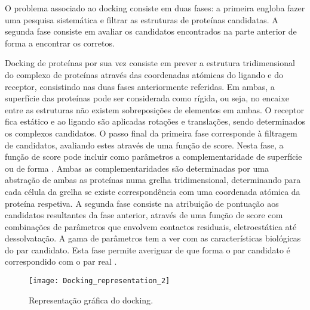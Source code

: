 O problema associado ao docking consiste em duas fases: a primeira engloba fazer uma pesquisa sistemática e filtrar as estruturas de proteínas candidatas. A segunda fase consiste em avaliar os candidatos encontrados na parte anterior de forma a encontrar os corretos\cite{prediction}. \par
 Docking de proteínas por sua vez consiste em prever a estrutura tridimensional do complexo de proteínas através das coordenadas atómicas do ligando e do receptor, consistindo nas duas fases anteriormente referidas. Em ambas, a superfície das proteínas pode ser considerada como rígida, ou seja, no encaixe entre as estruturas não existem sobreposições de elementos em ambas. O receptor fica estático e ao ligando são aplicadas rotações e translações, sendo determinados os complexos candidatos. O passo final da primeira fase corresponde à filtragem de candidatos, avaliando estes através de uma função de score. Nesta fase, a função de score pode incluir como parâmetros a complementaridade de superfície ou de forma \cite{zdock}. Ambas as complementaridades são determinadas por uma abstração de ambas as proteínas numa grelha tridimensional, determinando para cada célula da grelha se existe correspondência com uma coordenada atómica da proteína respetiva. A segunda fase consiste na atribuição de pontuação aos candidatos resultantes da fase anterior, através de uma função de score com combinações de parâmetros que envolvem contactos residuais, eletroestática até dessolvatação. A gama de parâmetros tem a ver com as características biológicas do par candidato. Esta fase permite averiguar de que forma o par candidato é correspondido com o par real \cite{bigger2016}.
\begin{figure}[ht]
  \centering
    {\texttt{[image: Docking\_representation\_2]}}
  \caption{Representação gráfica do docking\cite{dockingWiki}.}
  \label{dockGraf}
\end{figure}

